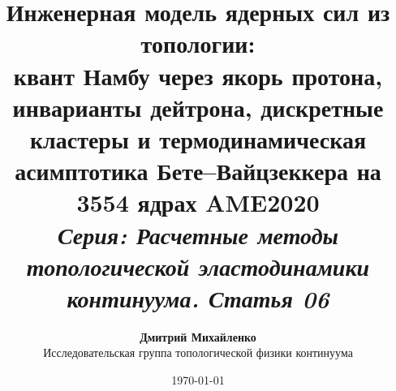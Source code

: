 \documentclass[11pt,a4paper]{article}
\theoremstyle{definition}
\theoremstyle{remark}
\begin{document}
\title{\textbf{\Large Инженерная модель ядерных сил из топологии:}\\
\large квант Намбу через якорь протона, инварианты дейтрона, дискретные кластеры и термодинамическая асимптотика Бете--Вайцзеккера на 3554 ядрах AME2020\\[2mm]
\normalsize \textit{Серия: Расчетные методы топологической эластодинамики континуума. Статья 06}}

\author{\textbf{Дмитрий Михайленко}\\[1mm]
\small Исследовательская группа топологической физики континуума}

\date{\today}

\maketitle
\end{document}
